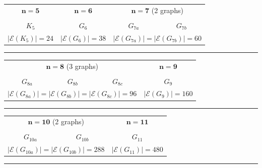 \documentclass{article}
\newcommand{\Kfive}{
\begin{tikzpicture}[scale=0.75]
    \node[cvertex] (0) at (90:1.5) {};
    \node[cvertex] (1) at (18:1.5) {};
    \node[cvertex] (2) at (306:1.5) {};
    \node[cvertex] (3) at (234:1.5) {};
    \node[cvertex] (4) at (162:1.5) {};
    
    \draw[thick] 
        (0)--(1) (0)--(2) (0)--(3) (0)--(4) 
        (1)--(2) (1)--(3) (1)--(4) 
        (2)--(3) (2)--(4) 
        (3)--(4);
\end{tikzpicture}
}
\newcommand{\Hocta}{
\begin{tikzpicture}[scale=0.8]
    \node[cvertex]       (v1) at (0, 1.5) {};
    \node[cvertex] (v2) at (1.5, -0.8) {};
    \node[cvertex]  (v3) at (-1.5, -0.8) {};

    \node[cvertex]       (v4) at (0, 0.5) {};
    \node[cvertex]  (v5) at (0.6, -0.4) {};
    \node[cvertex] (v6) at (-0.6, -0.4) {};

    \draw[thick] 
        (v1)--(v2) (v2)--(v3) (v3)--(v1)
        (v4)--(v5) (v5)--(v6) (v6)--(v4)
        (v1)--(v4) (v2)--(v5) (v3)--(v6)
        (v1)--(v5) (v2)--(v6) (v3)--(v4);
\end{tikzpicture}
}
\newcommand{\Gsevenfirst}{
\begin{tikzpicture}[scale=0.8]
    \node[cvertex]           (0) at (90:1.5) {};
    \node[cvertex]   (1) at ({90-360/7}:1.5) {};
    \node[cvertex] (2) at ({90-2*360/7}:1.5) {};
    \node[cvertex] (3) at ({90-3*360/7}:1.5) {};
    \node[cvertex] (4) at ({90-4*360/7}:1.5) {};
    \node[cvertex] (5) at ({90-5*360/7}:1.5) {};
    \node[cvertex] (6) at ({90-6*360/7}:1.5) {};
    
    \draw[thick] 
        (0)--(3) (0)--(4) (0)--(5) (0)--(6) 
        (1)--(3) (1)--(4) (1)--(5) (1)--(6) 
        (2)--(3) (2)--(4) (2)--(5) (2)--(6) 
        (3)--(5) 
        (4)--(6);
\end{tikzpicture}
}
\newcommand{\Gsevensecond}{
\begin{tikzpicture}[scale=0.8]
    \node[cvertex]           (0) at (90:1.5) {};
    \node[cvertex]   (1) at ({90-360/7}:1.5) {};
    \node[cvertex] (2) at ({90-2*360/7}:1.5) {};
    \node[cvertex] (3) at ({90-3*360/7}:1.5) {};
    \node[cvertex] (4) at ({90-4*360/7}:1.5) {};
    \node[cvertex] (5) at ({90-5*360/7}:1.5) {};
    \node[cvertex] (6) at ({90-6*360/7}:1.5) {};
    
    \draw[thick] 
        (0)--(2) (0)--(3) (0)--(4) (0)--(5) 
        (1)--(3) (1)--(4) (1)--(5) (1)--(6) 
        (2)--(4) (2)--(5) (2)--(6) 
        (3)--(5) (3)--(6) 
        (4)--(6);
\end{tikzpicture}
}
\newcommand{\GeightA}{
\begin{tikzpicture}[scale=0.7]
    \node[cvertex]  (1) at (90:1.5) {};
    \node[cvertex]  (2) at (45:1.5) {};
    \node[cvertex]   (3) at (0:1.5) {};
    \node[cvertex] (4) at (315:1.5) {};
    \node[cvertex] (5) at (270:1.5) {};
    \node[cvertex] (6) at (225:1.5) {};
    \node[cvertex] (7) at (180:1.5) {};
    \node[cvertex] (8) at (135:1.5) {};
    
    \draw[thick] 
        (1)--(4) (1)--(5) (1)--(6) (1)--(8) 
        (2)--(4) (2)--(6) (2)--(7) (2)--(8) 
        (3)--(5) (3)--(6) (3)--(7) (3)--(8) 
        (4)--(5) (4)--(7)
        (5)--(7) 
        (6)--(8);
\end{tikzpicture}
}
\newcommand{\GeightB}{
\begin{tikzpicture}[scale=0.7]
    \node[cvertex]  (1) at (90:1.5) {};
    \node[cvertex]  (2) at (45:1.5) {};
    \node[cvertex]   (3) at (0:1.5) {};
    \node[cvertex] (4) at (315:1.5) {};
    \node[cvertex] (5) at (270:1.5) {};
    \node[cvertex] (6) at (225:1.5) {};
    \node[cvertex] (7) at (180:1.5) {};
    \node[cvertex] (8) at (135:1.5) {};
    
    \draw[thick] 
        (1)--(3) (1)--(5) (1)--(6) (1)--(7) 
        (2)--(4) (2)--(5) (2)--(6) (2)--(8) 
        (3)--(5) (3)--(7) (3)--(8) 
        (4)--(6) (4)--(7) (4)--(8) 
        (5)--(7) 
        (6)--(8);
\end{tikzpicture}
}
\newcommand{\GeightC}{
\begin{tikzpicture}[scale=0.73]
    \node[cvertex]  (1) at (90:1.5) {};
    \node[cvertex]  (2) at (45:1.5) {};
    \node[cvertex]   (3) at (0:1.5) {};
    \node[cvertex] (4) at (315:1.5) {};
    \node[cvertex] (5) at (270:1.5) {};
    \node[cvertex] (6) at (225:1.5) {};
    \node[cvertex] (7) at (180:1.5) {};
    \node[cvertex] (8) at (135:1.5) {};
    
    \draw[thick] 
        (1)--(3) (1)--(5) (1)--(6) (1)--(7) 
        (2)--(4) (2)--(5) (2)--(7) (2)--(8) 
        (3)--(5) (3)--(6) (3)--(8) 
        (4)--(6) (4)--(7) (4)--(8) 
        (5)--(7) 
        (6)--(8);
\end{tikzpicture}
}
\newcommand{\Gnine}{
\begin{tikzpicture}[scale=0.73]
    \node[cvertex]  (1) at (90:1.5) {};
    \node[cvertex]  (2) at (50:1.5) {};
    \node[cvertex]  (3) at (10:1.5) {};
    \node[cvertex] (4) at (330:1.5) {};
    \node[cvertex] (5) at (290:1.5) {};
    \node[cvertex] (6) at (250:1.5) {};
    \node[cvertex] (7) at (210:1.5) {};
    \node[cvertex] (8) at (170:1.5) {};
    \node[cvertex] (9) at (130:1.5) {};
    
    \draw[thick] 
        (1)--(3) (1)--(5) (1)--(7) (1)--(8) 
        (2)--(4) (2)--(6) (2)--(7) (2)--(9) 
        (3)--(5) (3)--(7) (3)--(8) 
        (4)--(6) (4)--(8) (4)--(9) 
        (5)--(7) (5)--(9) 
        (6)--(8) (6)--(9);
\end{tikzpicture}
}
\newcommand{\GtenA}{
\begin{tikzpicture}[scale=0.8]
    \node[cvertex]     (3)  at (-1.8, 0) {};
    \node[cvertex] (10) at (1.8, 0) {};

    \node[cvertex] (5) at (0, 0.8) {};
    \node[cvertex]        (7) at (-1.2, 1.4) {};
    \node[cvertex]       (2) at (1.2, 1.4) {};
    \node[cvertex]       (9) at (0, 2.2) {};

    \node[cvertex] (4) at (0, -0.8) {};
    \node[cvertex]        (6) at (-1.2, -1.4) {};
    \node[cvertex]       (1) at (1.2, -1.4) {};
    \node[cvertex]       (8) at (0, -2.2) {};

    \draw[thick]
        (2)--(5) (2)--(7) (2)--(9) 
        (5)--(7) (5)--(9) 
        (7)--(9)
        
        (1)--(4) (1)--(6) (1)--(8) 
        (4)--(6) (4)--(8) 
        (6)--(8)
        
        (3)--(6) (3)--(8) (3)--(7) (3)--(9)
        
        (10)--(1) (10)--(4) (10)--(2) (10)--(5);
\end{tikzpicture}
}
\newcommand{\GtenB}{
\begin{tikzpicture}[scale=0.8]
    \node[cvertex]     (9)  at (-1.4, 0) {};
    \node[cvertex] (10) at (1.4, 0) {};

    \node[cvertex]  (2) at (-0.6, 0.8) {};
    \node[cvertex] (3) at (0.6, 0.8) {};
    \node[cvertex]  (6) at (-1, 1.7) {};
    \node[cvertex] (8) at (1, 1.7) {};
    \node[cvertex] (7) at (0, 2.2) {};

    \node[cvertex]  (1) at (-0.4, -1) {};
    \node[cvertex] (4) at (0.4, -1) {};
    \node[cvertex] (5) at (0, -2.2) {};

    \draw[thick]
        (2)--(6) (2)--(7) (2)--(8) 
        (3)--(6) (3)--(7) (3)--(8) 
        (6)--(7) (6)--(8) 
        (7)--(8)
        
        (1)--(4) (1)--(5) 
        (4)--(5)
        
        (9)--(1) (9)--(4) (9)--(5) 
        (9)--(2)
        
        (10)--(1) (10)--(4) (10)--(5) 
        (10)--(3);
\end{tikzpicture}
}
\newcommand{\Geleven}{
\begin{tikzpicture}[scale=0.8]
    \node[cvertex]  (3) at (-1.8, 0) {};
    \node[cvertex] (8) at (1.8, 0) {};

    \node[cvertex] (5) at (0, 0.8) {};
    \node[cvertex]        (7) at (-1.2, 1.4) {};
    \node[cvertex]       (2) at (1.2, 1.4) {};
    \node[cvertex]       (9) at (0, 2.2) {};

    \node[cvertex] (1)  at (0, -0.8) {};
    \node[cvertex]     (10) at (-1.2, -1.4) {};
    \node[cvertex]    (11) at (1.2, -1.4) {};
    \node[cvertex]  (4)  at (-0.6, -2.2) {};
    \node[cvertex] (6)  at (0.6, -2.2) {};

    \draw[thick]
        (2)--(5) (2)--(7) (2)--(9) 
        (5)--(7) (5)--(9) 
        (7)--(9)
        
        (1)--(4) (1)--(6) (1)--(10) (1)--(11)
        (4)--(6) (4)--(10) (4)--(11)
        (6)--(10) (6)--(11)
        
        (3)--(7) (3)--(9) 
        (3)--(10)
        
        (8)--(2) (8)--(5) 
        (8)--(11)
        
        (3)--(8);
\end{tikzpicture}
}
\begin{document}
        \begin{center}

            \begin{tabular}{cccc}
                $\bm{n=5}$ &  $\bm{n=6}$ & \multicolumn{2}{c}{$\bm{n=7}$ (2 graphs) } \vspace{2mm}\\
                \Kfive & \Hocta &
                \Gsevenfirst & \Gsevensecond  \\
                $K_5$ & $G_6$ & $G_{7a}$ & $G_{7b}$ \vspace{1.5mm}\\
                $|\mathcal{E}(K_5)| =24 $ &  $|\mathcal{E}(G_6)| =38 $ & \multicolumn{2}{c}{$|\mathcal{E}(G_{7a})|= |\mathcal{E}(G_{7b})|= 60$} \vspace{1.5mm}\\
            \end{tabular}
            \noindent\rule{\textwidth}{0.4pt}
            \bigskip

            \begin{tabular}{cccc}
                \multicolumn{3}{c}{$\bm{n=8}$ (3 graphs)} & $\bm{n=9}$ \vspace{2mm}\\
                \GeightA & \GeightB & \GeightC & \Gnine  \\
                $G_{8a}$ & $G_{8b}$ & $G_{8c}$ & $G_{9}$ \vspace{1.5mm}\\
                \multicolumn{3}{c}{$|\mathcal{E}(G_{8a})|= |\mathcal{E}(G_{8b})|= |\mathcal{E}(G_{8c})|= 96$} & $|\mathcal{E}(G_9)| =160 $ \vspace{1.5mm}\\
            \end{tabular}
            \noindent\rule{\textwidth}{0.4pt}
            \bigskip

            \begin{tabular}{ccc}
                \multicolumn{2}{c}{$\bm{n=10}$ (2 graphs)} \hspace{5mm} & \hspace{5mm} $\bm{n=11}$ \vspace{2mm}\\
                \GtenA & \GtenB   \hspace{5mm} &  \hspace{5mm} \Geleven  \\
                $G_{10a}$ &  $G_{10b}$ \hspace{5mm} & \hspace{5mm} $G_{11}$ \vspace{1.5mm}\\
                \multicolumn{2}{c}{$|\mathcal{E}(G_{10a})|= |\mathcal{E}(G_{10b})|= 288$}  \hspace{5mm} & \hspace{5mm} $|\mathcal{E}(G_{11})| =480 $ \vspace{1.5mm}\\
            \end{tabular}
            \noindent\rule{\textwidth}{0.4pt}
            \bigskip


\end{center}
\end{document}
